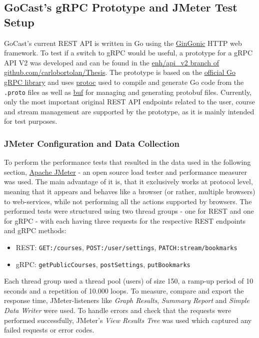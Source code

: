 \subsection{GoCast's gRPC Prototype and JMeter Test Setup}

GoCast's current REST API is written in Go using the \href{https://github.com/gin-gonic/gin}{GinGonic} HTTP web framework. To test if a switch to gRPC would be useful, a prototype for a gRPC \ac{API} V2 was developed and can be found in the \href{https://github.com/carlobortolan/Thesis/tree/enh/api\_v2}{enh/api\_v2 branch of github.com/carlobortolan/Thesis}.
The prototype is based on the \href{https://google.golang.org/grpc}{official Go gRPC library} and uses \href{https://github.com/protocolbuffers/protobuf}{protoc} used to compile and generate Go code from the \texttt{.proto} files as well as \href{https://github.com/bufbuild/buf}{buf} for managing and generating protobuf files. Currently, only the most important original REST \ac{API} endpoints related to the user, course and stream management are supported by the prototype, as it is mainly intended for test purposes.

\subsubsection{JMeter Configuration and Data Collection}

To perform the performance tests that resulted in the data used in the following section, \href{https://jmeter.apache.org/}{Apache JMeter} - an open source load tester and performance measurer was used. The main advantage of it is, that it exclusively works at protocol level, meaning that it appears and behaves like a browser (or rather, multiple browsers) to web-services, while not performing all the actions supported by browsers. The performed tests were structured using two thread groups - one for REST and one for gRPC - with each having three requests for the respective REST endpoints and gRPC methods:
\begin{itemize}
    \item REST: \texttt{GET:/courses}, \texttt{POST:/user/settings}, \texttt{PATCH:stream/bookmarks}
    \item gRPC: \texttt{getPublicCourses}, \texttt{postSettings}, \texttt{putBookmarks}
\end{itemize}
Each thread group used a thread pool (users) of size 150, a ramp-up period of 10 seconds and a repetition of 10.000 loops.
To measure, compare and export the response time, JMeter-listeners like \textit{Graph Results}, \textit{Summary Report} and \textit{Simple Data Writer} were used. To handle errors and check that the requests were performed successfully, JMeter’s \textit{View Results Tree} was used which captured any failed requests or error codes.

